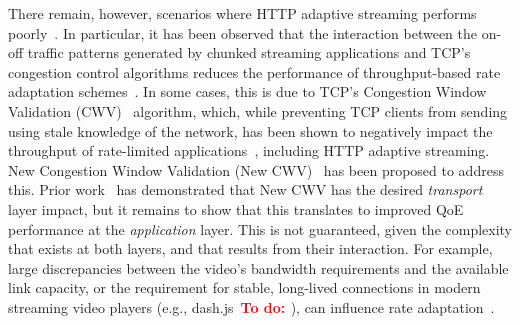\documentclass[10pt,sigconf,anonymous]{acmart}
\newcommand{\todo}[1]{\textbf{\textcolor{red}{To do: #1}}}
\begin{document}
There remain, however, scenarios where HTTP adaptive streaming performs poorly~\cite{Spiteri-2016-BOLA,Kua-2017-a-survey-rate-adaptation-dash}. In particular, it has been observed that the interaction between the on-off traffic patterns generated by chunked streaming applications and TCP's congestion control algorithms reduces the performance of throughput-based rate adaptation schemes~\cite{Akhshabi-2012-http-adaptive-players-compete,Stohr-2017-where-are-the-sweet-spots-maci}. In some cases, this is due to TCP's Congestion Window Validation (CWV)~\cite{rfc2861-2000-padhye-congestion-window-validation} algorithm, which, while preventing TCP clients from sending using stale knowledge of the network, has been shown to negatively impact the throughput of rate-limited applications~\cite{Nazir-2014-performance-evaluation-congestion-window-validation-dash-newcwv}, including HTTP adaptive streaming. New Congestion Window Validation (New CWV)~\cite{rfc7661-2015-fairhurst-new-cwnd-validation} has been proposed to address this. Prior work~\cite{Nazir-2014-performance-evaluation-congestion-window-validation-dash-newcwv} has demonstrated that New CWV has the desired \emph{transport} layer impact, but it remains to show that this translates to improved QoE performance at the \emph{application} layer. This is not guaranteed, given the complexity that exists at both layers, and that results from their interaction. For example, large discrepancies between the video's bandwidth requirements and the available link capacity, or the requirement for stable, long-lived connections in modern streaming video players (e.g., dash.js~\todo{\cite{..}}), can influence rate adaptation~\cite{Spiteri-2019-from-theory-to-practice-sabre}.



\end{document}
